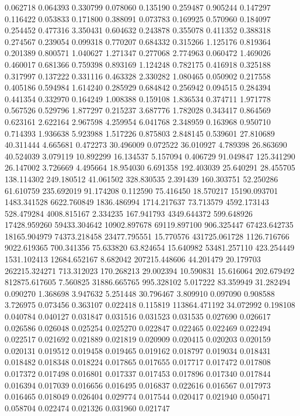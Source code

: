 0.062718
0.064393
0.330799
0.078060
0.135190
0.259487
0.905244
0.147297
0.116422
0.053833
0.171800
0.388091
0.073783
0.169925
0.570960
0.184097
0.254452
0.477316
3.350431
0.604632
0.243878
0.355078
0.411352
0.388318
0.274567
0.239054
0.099318
0.770207
0.684332
0.315266
1.125176
0.819364
0.201389
0.800571
1.040627
1.271347
0.277068
2.774963
0.060472
1.469026
0.460017
0.681366
0.759398
0.893169
1.124248
0.782175
0.416918
0.325188
0.317997
0.137222
0.331116
0.463328
2.330282
1.080465
0.050902
0.217558
0.405186
0.594984
1.614240
0.285929
0.684842
0.256942
0.094515
0.284394
0.441354
0.332970
0.164249
1.008388
0.159108
1.836534
0.374711
1.971778
0.567526
0.529796
1.877297
0.215237
3.687776
1.782028
0.343417
0.864569
0.623161
2.622164
2.967598
4.259954
6.041768
2.348959
0.163968
0.950710
0.714393
1.936638
5.923988
1.517226
0.875803
2.848145
0.539601
27.810689
40.311444
4.665681
0.472273
30.496009
0.072522
36.010927
4.789398
26.863690
40.524039
3.079119
10.892299
16.134537
5.157094
0.406729
91.049847
125.341290
26.147002
3.726669
4.495664
18.954030
6.691358
192.403039
25.640291
28.455705
138.114302
249.180512
41.061502
328.830535
2.391439
160.303751
52.250286
61.610759
235.692019
91.174208
0.112590
75.416450
18.570217
15190.093701
1483.341528
6622.760849
1836.486994
1714.217637
73.713579
4592.173143
528.479284
4008.815167
2.334235
167.941793
4349.644372
599.648926
17428.959260
59433.304642
10902.897678
69119.897100
906.325447
67423.642735
18165.904979
74373.218458
23477.795551
15.770576
431725.061728
1126.716766
9022.619365
700.341356
75.633820
63.824654
15.640982
53481.257110
423.254449
1531.102413
12684.652167
8.682042
207215.448606
44.201479
20.179703
262215.324271
713.312023
170.268213
29.002394
10.590831
15.616064
202.679492
812875.617605
7.560825
31886.665765
995.328102
5.017222
83.359949
31.282494
0.090270
1.368698
3.947632
5.251448
30.796467
3.809910
0.097090
0.908588
3.726975
0.073456
0.363107
0.022418
0.115819
113864.471192
34.072992
0.198108
0.040784
0.040127
0.031847
0.031516
0.031523
0.031535
0.027690
0.026617
0.026586
0.026048
0.025254
0.025270
0.022847
0.022465
0.022469
0.022494
0.022517
0.021692
0.021889
0.021819
0.020909
0.020415
0.020203
0.020159
0.020131
0.019512
0.019458
0.019465
0.019162
0.018797
0.019034
0.018431
0.018482
0.018348
0.018224
0.017865
0.017655
0.017717
0.017472
0.017808
0.017372
0.017498
0.016801
0.017337
0.017453
0.017896
0.017340
0.017844
0.016394
0.017039
0.016656
0.016495
0.016837
0.022616
0.016567
0.017973
0.016465
0.018049
0.026404
0.029774
0.017544
0.020417
0.021940
0.050471
0.058704
0.022474
0.021326
0.031960
0.021747
